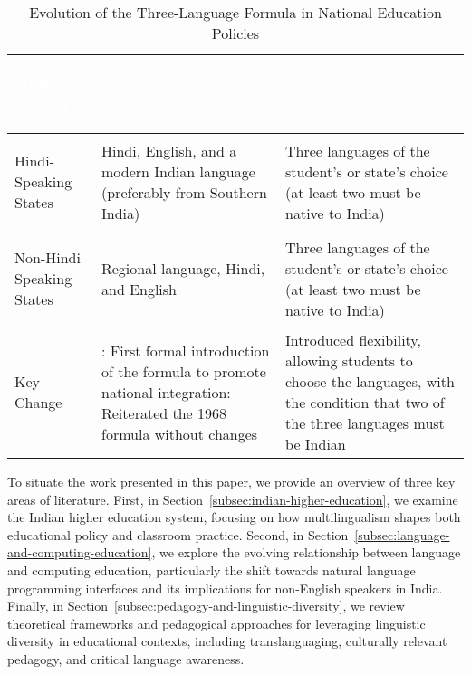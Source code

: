 \begin{table*}[ht]
\centering
\renewcommand{\arraystretch}{1.8}
\begin{tabularx}{\textwidth}{>{\bfseries\raggedright\arraybackslash}p{3.5cm} >{\raggedright\arraybackslash}X >{\raggedright\arraybackslash}X}
  \hline
\rowcolor{steelblue}
\textcolor{white}{NEP Edition} & \textcolor{white}{\textbf{1968 \& 1986}~\cite{NEP1968,NEP1986}} &
\textcolor{white}{\textbf{2020}~\cite{NEP2020}} \\ \hline
\rowcolor{palesteelblue}
Hindi-Speaking States & Hindi, English, and a modern Indian language (preferably from Southern India) & Three languages of the student's or state's choice (at least two must be native to India) \\
\rowcolor{white}
Non-Hindi Speaking States & Regional language, Hindi, and English & Three languages of the student's or state's choice (at least two must be native to India) \\
\rowcolor{palesteelblue}
Key Change & 1968: First formal introduction of the formula to promote national integration\newline\newline 1986: Reiterated the 1968 formula without changes & Introduced flexibility, allowing students to choose the languages, with the condition that two of the three languages must be Indian \\ \hline
\end{tabularx}
\vspace{0.5em}
\caption{Evolution of the Three-Language Formula in National Education Policies}
\label{tab:three-language-formula}
\end{table*}

To situate the work presented in this paper, we provide an overview of three
key areas of literature. First, in Section~\ref{subsec:indian-higher-education},
we examine the Indian higher education system, focusing on how multilingualism
shapes both educational policy and classroom practice. Second, in
Section~\ref{subsec:language-and-computing-education}, we explore the evolving
relationship between language and computing education, particularly the shift
towards natural language programming interfaces and its implications for
non-English speakers in India. Finally, in
Section~\ref{subsec:pedagogy-and-linguistic-diversity}, we review theoretical
frameworks and pedagogical approaches for leveraging linguistic diversity in
educational contexts, including translanguaging, culturally relevant pedagogy,
and critical language awareness.

